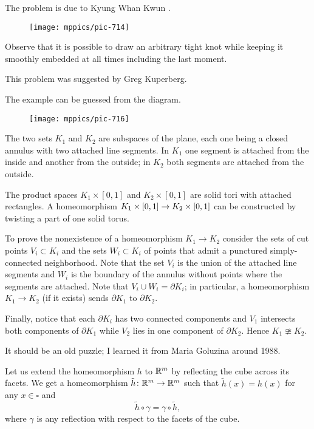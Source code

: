 The problem is due to Kyung Whan Kwun \cite{kwun}.


\begin{figure}[!ht]
\vskip0mm
\centering
\texttt{[image: mppics/pic-714]}
\end{figure}

Observe that it is possible to draw an arbitrary tight knot 
while keeping it smoothly embedded at all times including the last moment.\qeds

This problem was suggested by Greg Kuperberg.


The example can be guessed from the diagram.

\begin{wrapfigure}[6]{r}{50 mm}
\vskip-0mm
\centering
\texttt{[image: mppics/pic-716]}
\end{wrapfigure}

The two sets $K_1$ and $K_2$ are subspaces of the plane, 
each one being a closed annulus with two attached line segments.
In $K_1$ one segment is attached from the inside and another from the outside; 
in $K_2$ both segments are attached from the outside.

The product spaces $K_1\times[0,1]$ and $K_2\times[0,1]$ are solid tori with attached rectangles.
A homeomorphism $K_1\times[0,1]\z\to K_2\times[0,1]$ can be constructed by twisting a part of one solid torus.

To prove the nonexistence of a homeomorphism $K_1\to K_2$ consider the sets of cut points $V_i\subset K_i$ and the sets $W_i\subset K_i$ of points that admit a punctured simply-connected neighborhood.
Note that the set $V_i$ is the union of the attached line segments 
and $W_i$ is the boundary of the annulus without points where the segments are attached.
Note that $V_i\cup W_i=\partial K_i$;
in particular, a homeomorphism $K_1\to K_2$ (if it exists) sends $\partial K_1$ to $\partial K_2$.

Finally, notice that each $\partial K_i$ has two connected components and
$V_1$ intersects both components of $\partial K_1$
while $V_2$ lies in one component of $\partial K_2$.
Hence $K_1\ncong K_2$.
\qeds

It should be an old puzzle;
I learned it from Maria Goluzina around 1988.


Let us extend the homeomorphism $h$ to $\mathbb{R}^m$ by reflecting the cube across its facets.
We get a homeomorphism $\tilde h\colon\mathbb{R}^m\to\mathbb{R}^m$ such that $\tilde h(x)=h(x)$ for any $x\in\square$ and 
\[\tilde h\circ\gamma=\gamma\circ \tilde h,\]
where $\gamma$ is any reflection with respect to the facets of the cube.

